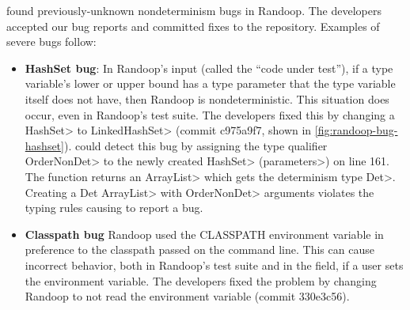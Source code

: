 \TheDeterminismChecker found \numRandoopBugs previously-unknown
nondeterminism bugs in Randoop.
The developers accepted our bug reports and committed fixes to the repository. 
Examples
of severe bugs follow:

\begin{itemize}
    \item
    \textbf{HashSet bug}: In Randoop's input (called the ``code under test''),
    if a type variable's lower or upper
    bound has a type parameter that the type variable itself does not have,
    then Randoop is nondeterministic.
    This situation does occur, even in Randoop's test suite.
    The developers fixed this by changing a \<HashSet> to \<LinkedHashSet>
    (commit c975a9f7, shown in \cref{fig:randoop-bug-hashset}).
    \TheDeterminismChecker could detect this bug by assigning the type qualifier \<OrderNonDet>
    to the newly created \<HashSet> (\<parameters>)
    on line 161. The function returns an \<ArrayList> which gets the
    determinism type \<Det>.
    Creating a \<Det ArrayList> with 
    \<OrderNonDet> arguments violates the typing rules causing \theDeterminismChecker to report a bug.
    
    \item
    \textbf{Classpath bug}
    Randoop used the CLASSPATH environment variable in preference to the
    classpath passed on the command line.
    This can cause incorrect behavior, both in Randoop's test suite and in the field,
    if a user sets the environment variable.
    The developers fixed the problem by changing Randoop to not read the environment variable
    (commit 330e3c56).
\end{itemize}




